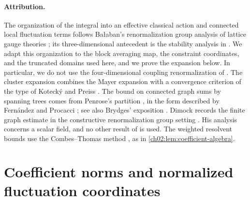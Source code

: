 \paragraph{Attribution.}
The organization of the integral into an effective classical action and connected local fluctuation terms follows Bałaban's renormalization group analysis of lattice gauge theories \cite{Balaban1987RGI,Balaban1988RGII}; its three-dimensional antecedent is the stability analysis in \cite{Balaban1985UV}. We adapt this organization to the block averaging map, the constraint coordinates, and the truncated domains used here, and we prove the expansion below. In particular, we do not use the four-dimensional coupling renormalization of \cite{Balaban1987RGI}. The cluster expansion combines the Mayer expansion with a convergence criterion of the type of Kotecký and Preiss \cite{KoteckyPreiss1986}. The bound on connected graph sums by spanning trees comes from Penrose's partition \cite{Penrose1967}, in the form described by Fernández and Procacci \cite[Section~4.1]{FernandezProcacci2007}; see also Brydges' exposition \cite{Brydges1986}. Dimock records the finite graph estimate in the constructive renormalization group setting \cite[Appendix~B, Theorem~27, p.~39, and (323), p.~42]{Dimock2013v2}. His analysis concerns a scalar field, and no other result of \cite{Dimock2013v2} is used. The weighted resolvent bounds use the Combes--Thomas method \cite{CombesThomas1973}, as in \cref{ch02:lem:coefficient-algebra}.

\section{Coefficient norms and normalized fluctuation coordinates}\label{ch09:sec:coordinates}

